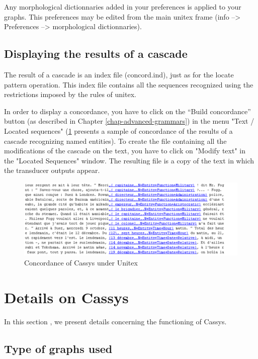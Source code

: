 Any morphological dictionnaries added in your preferences is applied to your
graphs. This preferences may be edited from the main unitex frame (info -->
Preferences --> morphological dictionnaries).

\subsection{Displaying the results of a cascade}
\label{subsec:resultsCascade}

The result of a cascade is an index file (concord.ind), just as for the locate pattern operation. This index file contains all the sequences recognized using the restrictions imposed by the rules of unitex.

\bigskip
\noindent In order to display a concordance, you have to click on the "`Build concordance"' button (as described in Chapter \ref{chap-advanced-grammars}) 
in the menu "Text / Located sequences" (\ref{fig13-04} presents a sample of concordance of the results of a cascade recognizing named entities).
To create the file containing all the modifications of the cascade on the text, you have to click on "Modify text" in the "Located Sequences" window.
 The resulting file is a copy of the text in which the transducer outputs appear.

\begin{figure}[!htb]
  \centering
  \includegraphics[width=14cm]{resources/img/fig13-04.png}
  \caption{Concordance of Cassys under Unitex}
  \label{fig13-04}
\end{figure}

\section{Details on Cassys}

In this section , we present details concerning the functioning of Cassys.

\subsection{Type of graphs used}

